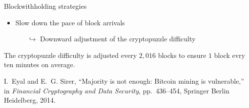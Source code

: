 \documentclass{beamer}
\begin{document}
\begin{frame}{Blockwithholding strategies}
\begin{itemize}
\begin{itemize}
  \end{itemize}
  \item Slow down the pace of block arrivals
  \begin{itemize}
    \scriptsize
    \item[$\hookrightarrow$] Downward adjustment of the cryptopuzzle difficulty
  \end{itemize}
\end{itemize}
\begin{tcolorbox}[enhanced,drop shadow, title=Difficulty adjustments]
The cryptopuzzle difficulty is adjusted every $2,016$ blocks to ensure $1$ block evry ten minutes on average.
\end{tcolorbox}
\tiny
\begin{thebibliography}{1}
I.~Eyal and E.~G. Sirer, ``Majority is not enough: Bitcoin mining is
  vulnerable,'' in {\em Financial Cryptography and Data Security},
  pp.~436--454, Springer Berlin Heidelberg, 2014.
\end{thebibliography}
\end{frame}
\end{document}
